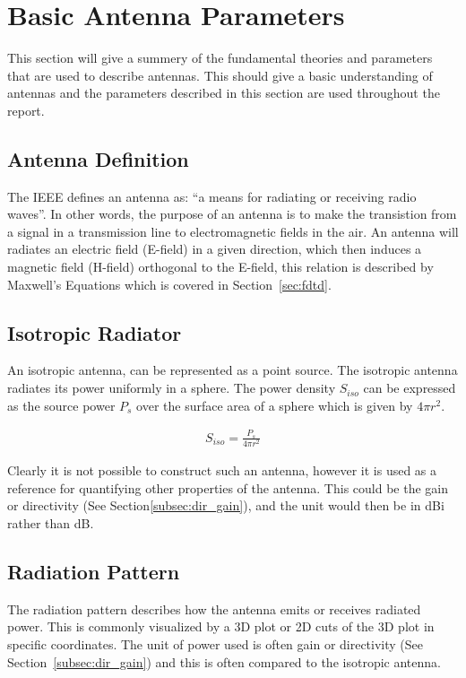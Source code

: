 \section{Basic Antenna Parameters}
This section will give a summery of the fundamental theories and parameters that are used to describe antennas. This should give a basic understanding of antennas and the parameters described in this section are used throughout the report. 

\subsection{Antenna Definition}
\label{subsec:antenna-def}
The IEEE defines an antenna as: ``a means for radiating or receiving radio waves''. In other words, the purpose of an antenna is to make the transistion from a signal in a transmission line to electromagnetic fields in the air. An antenna will radiates an electric field (E-field) in a given direction, which then induces a magnetic field (H-field) orthogonal to the E-field, this relation is described by Maxwell's Equations which is covered in Section~\ref{sec:fdtd}. 

\subsection{Isotropic Radiator}
\label{subsec:isotropic-ant}
An isotropic antenna, can be represented as a point source. The isotropic antenna radiates its power uniformly in a sphere. The power density $S_{iso}$ can be expressed as the source power $P_s$ over the surface area of a sphere which is given by $4\pi r^2$. 

\begin{align}
  S_{iso} = \frac{P_s}{4\pi r^2}
\end{align}

Clearly it is not possible to construct such an antenna, however it is used as a reference for quantifying other properties of the antenna. This could be the gain or directivity (See Section\ref{subsec:dir_gain}), and the unit would then be in \si{dBi} rather than \si{dB}.

\subsection{Radiation Pattern}
\label{subsec:radiation-p}
The radiation pattern describes how the antenna emits or receives radiated power. This is commonly visualized by a 3D plot or 2D cuts of the 3D plot in specific coordinates. The unit of power used is often gain or directivity (See Section~\ref{subsec:dir_gain}) and this is often compared to the isotropic antenna. 

